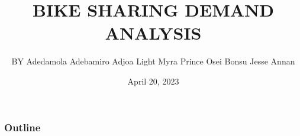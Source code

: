 \documentclass[11pt]{beamer}
\begin{document}
	\author[Group 12]{
	BY \newline Adedamola Adebamiro \newline Adjoa Light Myra \newline Prince Osei Bonsu \newline Jesse Annan
	}
	\title{BIKE SHARING DEMAND ANALYSIS}
	\date{April 20, 2023}
	\begin{frame}[plain]
		\maketitle
	\end{frame}
	
	\begin{frame}
		\frametitle{Outline}
		
	\end{frame}
\end{document}
